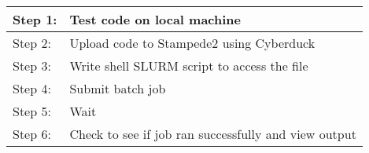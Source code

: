 \documentclass{article}
\begin{document}
\begin{center}
	\begin{longtable}{ |M{5.5cm}|M{8.75cm}| }
		\hline
		Step 1: & Test code on local machine\\
		\hline
		Step 2: & Upload code to Stampede2 using Cyberduck\\
		\hline
		Step 3: & Write shell SLURM script to access the file\\
		\hline
		Step 4: & Submit batch job\\
		\hline
		Step 5: & Wait\\
		\hline
		Step 6: & Check to see if job ran successfully and view output\\
		\hline
	\end{longtable}
\end{center}
\end{document}
